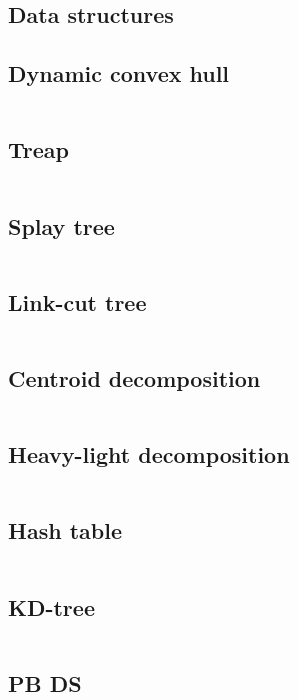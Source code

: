\documentclass[letterpaper,landscape]{article}
\begin{document}
\begin{multicols*}{2}
  \section{Data structures}

  \subsection{Dynamic convex hull}
  \inputminted{cpp}{src/ds_dynamic_convex_hull.cpp}

  \subsection{Treap}
  \inputminted{cpp}{src/ds_treap.cpp}

  \subsection{Splay tree}
  \inputminted{cpp}{src/ds_splay_tree.cpp}

  \subsection{Link-cut tree}
  \inputminted{cpp}{src/ds_link_cut_tree.cpp}

  \subsection{Centroid decomposition}
  \inputminted{cpp}{src/ds_centroid_decomposition.cpp}

  \subsection{Heavy-light decomposition}
  \inputminted{cpp}{src/ds_heavy_light_decomposition.cpp}

  \subsection{Hash table}
  \inputminted{cpp}{src/ds_hash_table.cpp}
  
  \subsection{KD-tree}
  \inputminted{cpp}{src/KDTree.cpp}
  
  \subsection{PB DS}
  \inputminted{cpp}{src/ds_pbds.cpp}


\end{multicols*}
\end{document}
